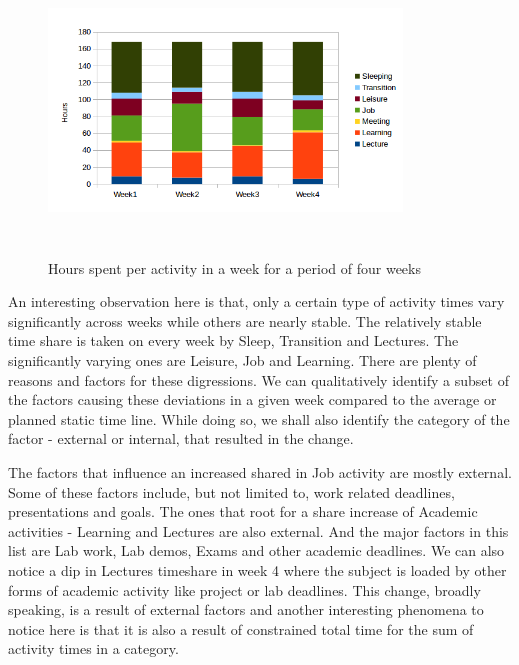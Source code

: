 \documentclass[conference]{IEEEtran}
\begin{document}
\begin{figure}[hb]
  \centering
  \includegraphics[width=3.7in,height=3.0in]{bar}
  \caption[]
   {Hours spent per activity in a week for a period of four weeks}
\end{figure}

An interesting observation here is that, only a certain type of activity times vary significantly across weeks while others are nearly stable. The relatively stable time share is taken on every week by Sleep, Transition and Lectures. The significantly varying ones are Leisure, Job and Learning. There are plenty of reasons and factors for these digressions. We can qualitatively identify a subset of the factors causing these deviations in a given week compared to the average or planned static time line. While doing so, we shall also identify the category of the factor - external or internal, that resulted in the change. 

The factors that influence an increased shared in Job activity are mostly external. Some of these factors include, but not limited to, work related deadlines, presentations and goals. The ones that root for a share increase of Academic activities - Learning and Lectures are also external. And the major factors in this list are Lab work, Lab demos, Exams and other academic deadlines. We can also notice a dip in Lectures timeshare in week 4 where the subject is loaded by other forms of academic activity like project or lab deadlines. This change, broadly speaking, is a result of external factors and another interesting phenomena to notice here is that it is also a result of constrained total time for the sum of activity times in a category.
\end{document}
